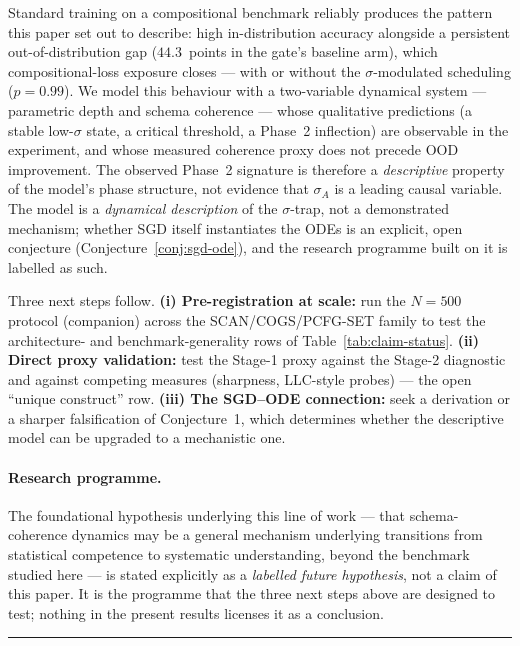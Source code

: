 \documentclass{article}
\theoremstyle{definition}
\begin{document}
Standard training on a compositional benchmark reliably produces the
pattern this paper set out to describe: high in-distribution accuracy
alongside a persistent out-of-distribution gap ($44.3$~points in the
gate's baseline arm), which compositional-loss exposure closes --- with
or without the $\sigma$-modulated scheduling ($p = 0.99$). We model this
behaviour with a two-variable dynamical system --- parametric depth and
schema coherence --- whose qualitative predictions (a stable low-$\sigma$
state, a critical threshold, a Phase~2 inflection) are observable in the
experiment, and whose measured coherence proxy does not precede OOD
improvement. The observed Phase~2 signature is therefore a
\emph{descriptive} property of the model's phase structure, not
evidence that $\sigma_A$ is a leading causal variable. The model is a
\emph{dynamical description} of
the $\sigma$-trap, not a demonstrated mechanism; whether SGD itself
instantiates the ODEs is an explicit, open conjecture
(Conjecture~\ref{conj:sgd-ode}), and the research programme built on it
is labelled as such.

Three next steps follow. \textbf{(i) Pre-registration at scale:} run
the $N = 500$ protocol (companion) across the SCAN/COGS/PCFG-SET family
to test the architecture- and benchmark-generality rows of
Table~\ref{tab:claim-status}. \textbf{(ii) Direct proxy validation:}
test the Stage-1 proxy against the Stage-2 diagnostic and against
competing measures (sharpness, LLC-style probes) --- the open
``unique construct'' row. \textbf{(iii) The SGD--ODE connection:} seek
a derivation or a sharper falsification of Conjecture~1, which
determines whether the descriptive model can be upgraded to a
mechanistic one.

\paragraph*{Research programme.}
The foundational hypothesis underlying this line of work --- that
schema-coherence dynamics may be a general mechanism underlying
transitions from statistical competence to systematic understanding,
beyond the benchmark studied here --- is stated explicitly as a
\emph{labelled future hypothesis}, not a claim of this paper. It is the
programme that the three next steps above are designed to test; nothing
in the present results licenses it as a conclusion.

\noindent\rule{\linewidth}{0.4pt}

\end{document}
